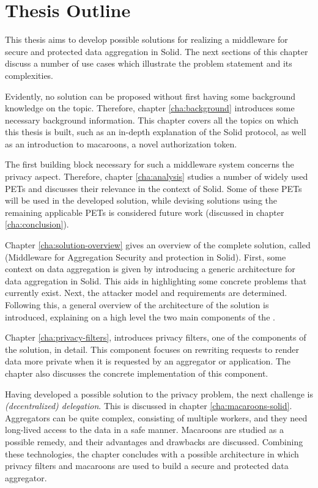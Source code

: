 \newpage
\section{Thesis Outline}
\label{sec:outline}
This thesis aims to develop possible solutions for realizing a middleware for secure and protected data aggregation in Solid. The next sections of this chapter discuss a number of use cases which illustrate the problem statement and its complexities.

Evidently, no solution can be proposed without first having some background knowledge on the topic. Therefore, chapter \ref{cha:background} introduces some necessary background information. This chapter covers all the topics on which this thesis is built, such as an in-depth explanation of the Solid protocol, as well as an introduction to macaroons, a novel authorization token. 

The first building block necessary for such a middleware system concerns the privacy aspect. Therefore, chapter \ref{cha:analysis} studies a number of widely used \acrlong{PETs} and discusses their relevance in the context of Solid. Some of these \acrshort{PETs} will be used in the developed solution, while devising solutions using the remaining applicable \acrshort{PETs} is considered future work (discussed in chapter \ref{cha:conclusion}).

Chapter \ref{cha:solution-overview} gives an overview of the complete solution, called \middleware{} (Middleware for Aggregation Security and protection in Solid). First, some context on data aggregation is given by introducing a generic architecture for data aggregation in Solid. This aids in highlighting some concrete problems that currently exist. Next, the attacker model and requirements are determined. Following this, a general overview of the architecture of the solution is introduced, explaining on a high level the two main components of the \middleware{}.

Chapter \ref{cha:privacy-filters}, introduces privacy filters, one of the components of the solution, in detail. This component focuses on rewriting requests to render data more private when it is requested by an aggregator or application. The chapter also discusses the concrete implementation of this component.

Having developed a possible solution to the privacy problem, the next challenge is \textit{(decentralized) delegation}. This is discussed in chapter \ref{cha:macaroons-solid}. Aggregators can be quite complex, consisting of multiple workers, and they need long-lived access to the data in a safe manner. Macaroons are studied as a possible remedy, and their advantages and drawbacks are discussed. Combining these technologies, the chapter concludes with a possible architecture in which privacy filters and macaroons are used to build a secure and protected data aggregator.

